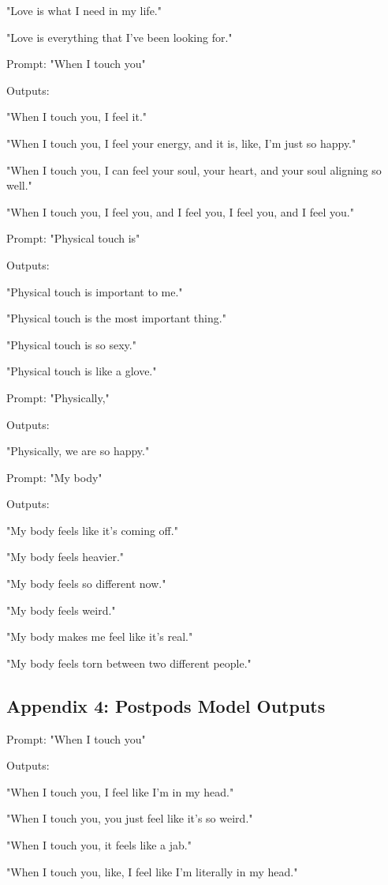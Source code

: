 \documentclass[11pt]{article}
\begin{document}
"Love is what I need in my life."

"Love is everything that I've been looking for."

Prompt: "When I touch you"

Outputs:

"When I touch you, I feel it."

"When I touch you, I feel your energy, and it is, like, I'm just so
happy."

"When I touch you, I can feel your soul, your heart, and your soul
aligning so well."

"When I touch you, I feel you, and I feel you, I feel you, and I feel
you."

Prompt: "Physical touch is"

Outputs:

"Physical touch is important to me."

"Physical touch is the most important thing."

"Physical touch is so sexy."

"Physical touch is like a glove."

Prompt: "Physically,"

Outputs:

"Physically, we are so happy."

Prompt: "My body"

Outputs:

"My body feels like it's coming off."

"My body feels heavier."

"My body feels so different now."

"My body feels weird."

"My body makes me feel like it's real."

"My body feels torn between two different people."

\subsection{Appendix 4: Postpods Model Outputs}
\label{sec:orgf1062a7}
Prompt: "When I touch you"

Outputs:

"When I touch you, I feel like I'm in my head."

"When I touch you, you just feel like it's so weird."

"When I touch you, it feels like a jab."

"When I touch you, like, I feel like I'm literally in my head."
\end{document}
